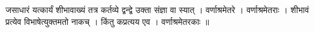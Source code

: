 जसाधारं यत्कार्यं शीभावाख्यं तत्र कर्तव्ये द्वन्द्वे उक्ता संज्ञा वा
स्यात् । वर्णाश्रमेतरे । वर्णाश्रमेतराः । शीभावं प्रत्येव
विभाषेत्युक्तमतो नाकच् । किंतु कप्रत्यय एव । वर्णाश्रमेतरकाः ॥
